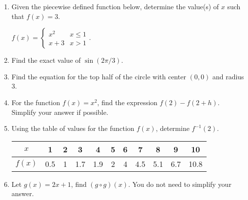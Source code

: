 \documentclass[12pt]{article}
\begin{document}
\begin{enumerate}
\quad \hfill \underline{\hspace{2in}}
\vfill

\item Given the piecewise defined function below, determine the value(s) of $x$ such that $f(x)=3.$

$f(x)=\begin{cases} x^2 & x \leq 1 \\ x+3 & x >1 \end{cases}.$
\quad \hfill \underline{\hspace{2in}}
\vfill

\item Find the exact value of $\sin ( 2 \pi/3).$
%

\quad \hfill \underline{\hspace{2in}}
\vfill

\item Find the equation for the top half of the circle with center $(0,0)$ and radius 3.
%

\quad \hfill \underline{\hspace{2in}}
\vfill

\vspace{1in}

\item For the function $f(x)=x^2$, find the expression $f(2)-f(2+h).$ Simplify your answer if possible.

\quad \hfill \underline{\hspace{2in}}
\vfill
\newpage
\item Using the table of values for the function $f(x)$, determine $f^{-1}(2).$\\

\begin{tabular}{| c||c|c|c|c|c|c|c|c|c|c|}
\hline
$x$ &1&2&3&4&5&6&7&8&9&10 \\
\hline
$f(x)$&0.5&1&1.7&1.9&2&4&4.5&5.1&6.7&10.8\\
\hline
\end{tabular}
%

\quad \hfill \underline{\hspace{2in}}
\vfill
\item Let $g(x)=2x+1$, find $(g \circ g)(x).$ You do not need to simplify your answer.

\quad \hfill \underline{\hspace{2in}}
\vfill


\end{enumerate}
\end{document}
